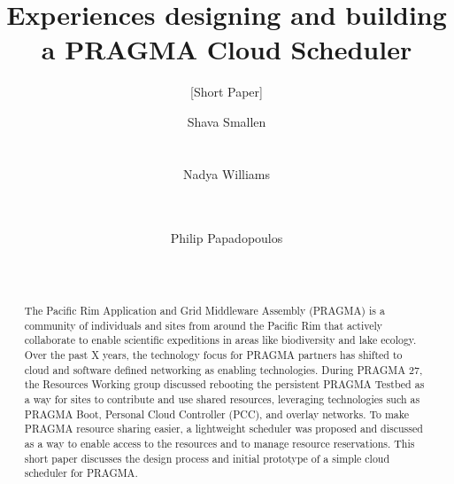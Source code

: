 \documentclass{acm_proc_article-sp}
\begin{document}
\title{Experiences designing and building a PRAGMA Cloud Scheduler}
\subtitle{[Short Paper]}


\author{
\alignauthor
Shava Smallen\\
      \\
      \\
\alignauthor
Nadya Williams\\
      \\
      \\
\and %
\alignauthor Philip Papadopoulos \\
      \\
      \\
}

\maketitle
\begin{abstract}
The Pacific Rim Application and Grid Middleware Assembly (PRAGMA) is a community of individuals and sites from around the Pacific Rim that actively collaborate to enable scientific expeditions in areas like biodiversity and lake ecology.  Over the past X years, the technology focus for PRAGMA partners has shifted to cloud and software defined networking as enabling technologies.  During PRAGMA 27, the Resources Working group discussed rebooting the persistent PRAGMA Testbed as a way for sites to contribute and use shared resources, leveraging technologies such as PRAGMA Boot, Personal Cloud Controller (PCC), and overlay networks.  To make PRAGMA resource sharing easier, a lightweight scheduler was proposed and discussed as a way to enable access to the resources and to manage resource reservations.  This short paper discusses the design process and initial prototype of a simple cloud scheduler for PRAGMA.  

\end{abstract}

\end{document}
